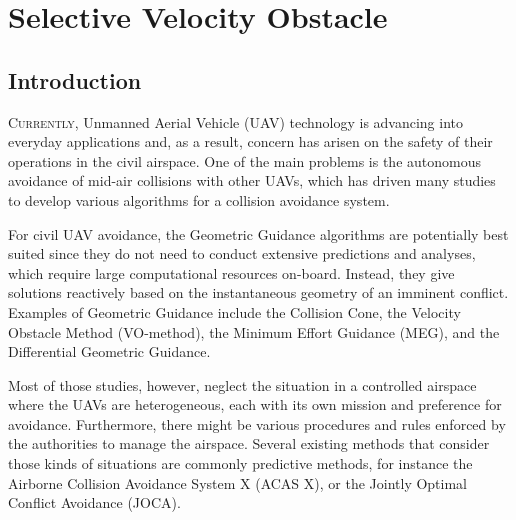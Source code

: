 \chapter{Selective Velocity Obstacle}
\label{Ch:IntroductionSVOI}


\section{Introduction}
\lettrine[lines=3, nindent=0pt]{C}{urrently}, Unmanned Aerial Vehicle (UAV) technology is advancing into everyday applications and, as a result, concern has arisen on the safety of their operations in the civil airspace\cite{Dalamagkidis:09}. One of the main problems is the autonomous avoidance of mid-air collisions with other UAVs, which has driven many studies to develop various algorithms for a collision avoidance system. 

For civil UAV avoidance, the Geometric Guidance algorithms are potentially best suited since they do not need to conduct extensive predictions and analyses, which require large computational resources on-board. Instead, they give solutions reactively based on the instantaneous geometry of an imminent conflict. Examples of Geometric Guidance include the Collision Cone\cite{Chakravarthy:98,Lorenz:13}, the Velocity Obstacle Method (VO-method)\cite{Fiorini:98,Kluge:06,vdberg:08,Snape:11,Choi:13,Ellerbroek2013c}, the Minimum Effort Guidance (MEG)\cite{Watanabe:13}, and the Differential Geometric Guidance\cite{Mujumdar:12}. 

Most of those studies, however, neglect the situation in a controlled airspace where the UAVs are heterogeneous, each with its own mission and preference for avoidance. Furthermore, there might be various procedures and rules enforced by the authorities to manage the airspace. Several existing methods that consider those kinds of situations are commonly predictive methods, for instance the Airborne Collision Avoidance System X (ACAS X)\cite{kochenderfer:2012}, or the Jointly Optimal Conflict Avoidance (JOCA)\cite{Graham:11}.

